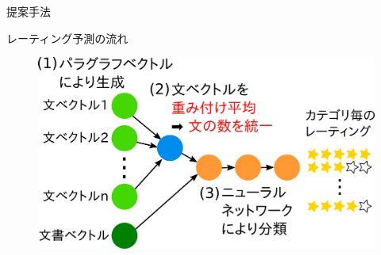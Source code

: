 \documentclass[aspectratio=43,unicode,10pt]{beamer}
\begin{document}
\begin{frame}{提案手法}{}
  \begin{block}{レーティング予測の流れ}
    \begin{figure}
      \includegraphics[width=0.9\linewidth]
                      {fig/model_with_detailed_processes.png}
    \end{figure}
  \end{block}
\end{frame}
\end{document}
